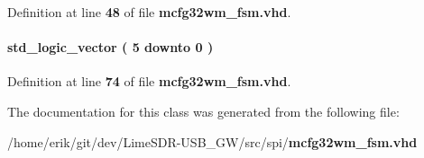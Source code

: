 Definition at line {\bf 48} of file {\bf mcfg32wm\+\_\+fsm.\+vhd}.

\paragraph[{state}]{ {\bfseries \textcolor{comment}{std\+\_\+logic\+\_\+vector}\textcolor{vhdlchar}{ }\textcolor{vhdlchar}{(}\textcolor{vhdlchar}{ }\textcolor{vhdlchar}{ } \textcolor{vhdldigit}{5} \textcolor{vhdlchar}{ }\textcolor{keywordflow}{downto}\textcolor{vhdlchar}{ }\textcolor{vhdlchar}{ } \textcolor{vhdldigit}{0} \textcolor{vhdlchar}{ }\textcolor{vhdlchar}{)}\textcolor{vhdlchar}{ }} \hspace{0.3cm}{\ttfamily [Signal]}}\label{classmcfg32wm__fsm_1_1mcfg32wm__fsm__arch_a8ef8985320e7338487f7a6ef4a46e6ec}


Definition at line {\bf 74} of file {\bf mcfg32wm\+\_\+fsm.\+vhd}.



The documentation for this class was generated from the following file\+:\begin{DoxyCompactItemize}
\item 
/home/erik/git/dev/\+Lime\+S\+D\+R-\/\+U\+S\+B\+\_\+\+G\+W/src/spi/{\bf mcfg32wm\+\_\+fsm.\+vhd}\end{DoxyCompactItemize}
